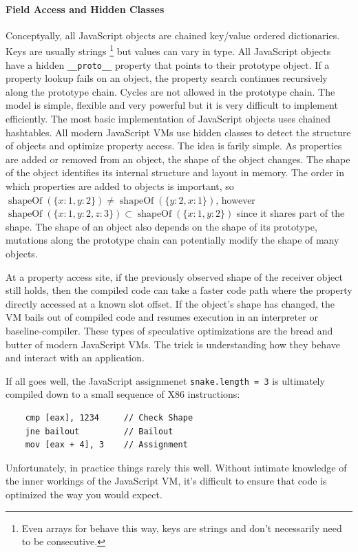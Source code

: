 \documentclass{acm_proc_article-sp}
\DeclareMathOperator{\shapeOf}{shapeOf}
\begin{document}
\paragraph{Field Access and Hidden Classes}
Conceptyally, all JavaScript objects are chained key/value ordered dictionaries.
Keys are usually strings \footnote{Even arrays for behave this way, keys are strings and don't necessarily need to be consecutive.} but values can vary in type.
All JavaScript objects have a hidden \texttt{\_\_proto\_\_} property that points to their prototype object.
If a property lookup fails on an object, the property search continues recursively along the prototype chain.
Cycles are not allowed in the prototype chain.
The model is simple, flexible and very powerful but it is very difficult to implement efficiently.
The most basic implementation of JavaScript objects uses chained hashtables.
All modern JavaScript VMs use hidden classes to detect the structure of objects and optimize property access.
The idea is farily simple.
As properties are added or removed from an object, the shape of the object changes.
The shape of the object identifies its internal structure and layout in memory.
The order in which properties are added to objects is important, so $\shapeOf(\{x: 1, y: 2\}) \neq \shapeOf(\{y: 2, x: 1\})$, 
however $\shapeOf(\{x: 1, y: 2, z: 3\}) \subset \shapeOf(\{x: 1, y: 2\})$ since it shares part of the shape.
The shape of an object also depends on the shape of its prototype, mutations along the prototype chain can potentially modify the shape of many objects.

At a property access site, if the previously observed shape of the receiver object still holds, then the compiled code can take a faster code path where the property directly accessed at a known slot offset.
If the object's shape has changed, the VM bails out of compiled code and resumes execution in an interpreter or baseline-compiler.
These types of speculative optimizations are the bread and butter of modern JavaScript VMs.
The trick is understanding how they behave and interact with an application. 

If all goes well, the JavaScript assignmenet \texttt{snake.length = 3} is ultimately compiled down to a small sequence of X86 instructions: 
\begin{verbatim}
	cmp [eax], 1234 	// Check Shape
	jne bailout     	// Bailout
	mov [eax + 4], 3	// Assignment
\end{verbatim}
Unfortunately, in practice things rarely this well.
Without intimate knowledge of the inner workings of the JavaScript VM, it's difficult to ensure that code is optimized the way you would expect.
\end{document}
